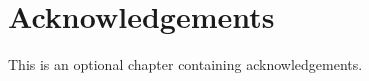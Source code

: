 \chapter{Acknowledgements}
\label{acknowledgements}

This is an optional chapter containing acknowledgements.
